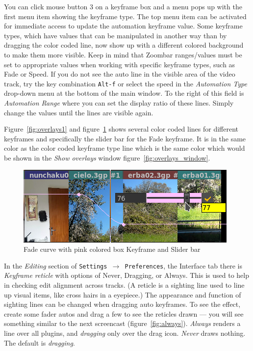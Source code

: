 You can click mouse button 3 on a keyframe box and a menu pops up with the first menu item showing the keyframe type.  The top menu item can be activated for immediate access to update the automation keyframe value.  Some keyframe types, which have values that can be manipulated in another way than by dragging the color coded line, now show up with a different colored background to make them more visible.  Keep in mind that Zoombar ranges/values must be set to appropriate values when working with specific keyframe types, such as Fade or Speed.  If you do not see the auto line in the visible area of the video track, try the key combination \texttt{Alt-f} or select the speed in the \textit{Automation Type} drop-down menu at the bottom of the main window.  To the right of this field is \textit{Automation Range} where you can set the display ratio of these lines. Simply change the values until the lines are visible again. 

Figure~\ref{fig:overlays1} and figure~\ref{fig:fade} shows several color coded lines for different key\-fra\-mes and specifically the slider bar for the Fade keyframe.  It is in the same color as the color coded keyframe type line which is the same color which would be shown in the \textit{Show overlays} window figure~\ref{fig:overlays_window}.

\begin{figure}[htpb]
    \centering
    \includegraphics[width=0.8\linewidth]{images/fade.png}
    \caption{Fade curve with pink colored box Keyframe and Slider bar}
    \label{fig:fade}
\end{figure}

In the \textit{Editing} section of \texttt{Settings $\rightarrow$ Preferences}, the Interface tab there is \textit{Keyframe reticle} with options of Never, Dragging, or Always.  This is used to help in checking edit alignment across tracks.  (A reticle is a sighting line used to line up visual items, like cross hairs in a eyepiece.)  The appearance and function of sighting lines can be changed when dragging auto keyframes.  To see the effect, create some fader autos and drag a few to see the reticles drawn --- you will see something similar to the next screencast (figure~\ref{fig:always}).  \textit{Always} renders a line over all plugins, and \textit{dragging} only over the drag icon. \textit{Never} draws nothing.  The default is \textit{dragging}.

